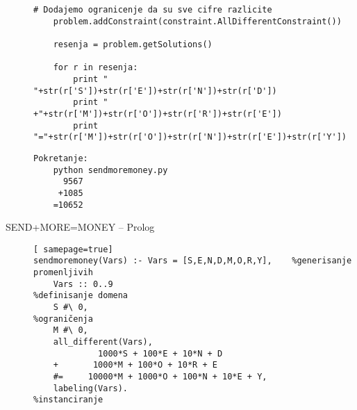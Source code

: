\documentclass[../main.tex]{subfiles}
\begin{document}
\begin{description}
\begin{boxprimer}
\begin{Verbatim}[samepage=true]
	# Dodajemo ogranicenje da su sve cifre razlicite
	problem.addConstraint(constraint.AllDifferentConstraint())

	resenja = problem.getSolutions()

	for r in resenja:
		print "  "+str(r['S'])+str(r['E'])+str(r['N'])+str(r['D'])
		print " +"+str(r['M'])+str(r['O'])+str(r['R'])+str(r['E'])
		print "="+str(r['M'])+str(r['O'])+str(r['N'])+str(r['E'])+str(r['Y'])
	\end{Verbatim}
	\end{boxprimer}
	\begin{boxprimer}[width=\linewidth/2]
	\begin{Verbatim}[samepage= true]
	Pokretanje:
	python sendmoremoney.py
	  9567	
	 +1085	
	=10652
	\end{Verbatim}
	\end{boxprimer}

	\item[SEND+MORE=MONEY -- Prolog ] \hfill
	\begin{boxprimer}
	\begin{Verbatim}[ samepage=true]
sendmoremoney(Vars) :- Vars = [S,E,N,D,M,O,R,Y], 	%generisanje promenljivih
	Vars :: 0..9                                     %definisanje domena
	S #\ 0,                                          %ograničenja
	M #\ 0,
	all_different(Vars),
			 1000*S + 100*E + 10*N + D
	+		1000*M + 100*O + 10*R + E
	#=     10000*M + 1000*O + 100*N + 10*E + Y,
	labeling(Vars).                                  %instanciranje
\end{Verbatim}
	\end{boxprimer}
	
\end{description}
\end{document}
